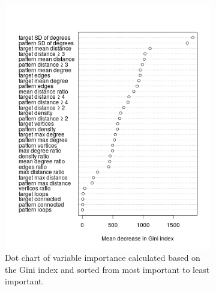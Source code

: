 \documentclass{l4proj}
\theoremstyle{definition}
\theoremstyle{remark}
\begin{document}
\begin{figure}
  \centering
  \begin{subfigure}[t]{0.45\textwidth}
    \centering
    \includegraphics[width=\textwidth]{images/unlabelled_variable_importance.png}
    \caption{Dot chart of variable importance calculated based on the Gini index
      and sorted from most important to least important.}
    \label{fig:unlabelled_variable_importance}
  \end{subfigure}
  \hfill
  \begin{subfigure}[t]{0.45\textwidth}
    \centering

\end{subfigure}
\end{figure}
\end{document}
